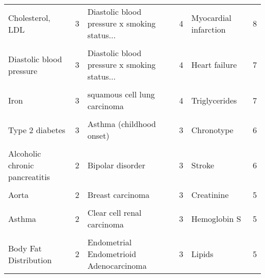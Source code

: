 \begin{table}[!htbp]
{\begin{tabular}[t]{lrlrlr}
Cholesterol, LDL & 3 & Diastolic blood pressure x smoking status... & 4 & Myocardial infarction & 8\\
\cellcolor{gray!6}{Chronotype} & \cellcolor{gray!6}{3} & \cellcolor{gray!6}{Height} & \cellcolor{gray!6}{4} & \cellcolor{gray!6}{Obesity-related traits} & \cellcolor{gray!6}{8}\\
Diastolic blood pressure & 3 & Diastolic blood pressure x smoking status... & 4 & Heart failure & 7\\
\cellcolor{gray!6}{Intraocular pressure} & \cellcolor{gray!6}{3} & \cellcolor{gray!6}{Diastolic blood pressure x smoking status...} & \cellcolor{gray!6}{4} & \cellcolor{gray!6}{Hemoglobin A, Glycosylated} & \cellcolor{gray!6}{7}\\
Iron & 3 & squamous cell lung carcinoma & 4 & Triglycerides & 7\\
\cellcolor{gray!6}{Triglycerides} & \cellcolor{gray!6}{3} & \cellcolor{gray!6}{Acute myeloid leukemia} & \cellcolor{gray!6}{3} & \cellcolor{gray!6}{Amyotrophic lateral sclerosis} & \cellcolor{gray!6}{6}\\
Type 2 diabetes & 3 & Asthma (childhood onset) & 3 & Chronotype & 6\\
\cellcolor{gray!6}{Waist circumference} & \cellcolor{gray!6}{3} & \cellcolor{gray!6}{Attention deficit hyperactivity disorder} & \cellcolor{gray!6}{3} & \cellcolor{gray!6}{Lipoproteins, VLDL} & \cellcolor{gray!6}{6}\\
Alcoholic chronic pancreatitis & 2 & Bipolar disorder & 3 & Stroke & 6\\
\cellcolor{gray!6}{Alcoholism} & \cellcolor{gray!6}{2} & \cellcolor{gray!6}{Blood protein levels} & \cellcolor{gray!6}{3} & \cellcolor{gray!6}{Coronary Artery Disease} & \cellcolor{gray!6}{5}\\
Aorta & 2 & Breast carcinoma & 3 & Creatinine & 5\\
\cellcolor{gray!6}{Arterial stiffness index} & \cellcolor{gray!6}{2} & \cellcolor{gray!6}{Chronic lymphocytic leukemia} & \cellcolor{gray!6}{3} & \cellcolor{gray!6}{Heel bone mineral density} & \cellcolor{gray!6}{5}\\
Asthma & 2 & Clear cell renal carcinoma & 3 & Hemoglobin S & 5\\
\cellcolor{gray!6}{Asthma (childhood onset)} & \cellcolor{gray!6}{2} & \cellcolor{gray!6}{Cutaneous melanoma} & \cellcolor{gray!6}{3} & \cellcolor{gray!6}{Inborn genetic diseases} & \cellcolor{gray!6}{5}\\
Body Fat Distribution & 2 & Endometrial Endometrioid Adenocarcinoma & 3 & Lipids & 5\\

\end{tabular}}
\end{table}
